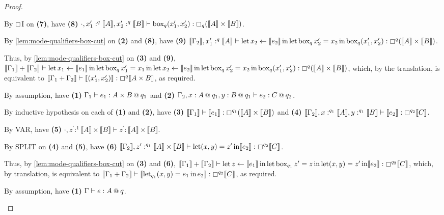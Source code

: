 \documentclass[acmsmall,screen,nonacm]{acmart}
\makeatletter
\DeclareMathOperator{\llet}{\text{let}}
\DeclareMathOperator{\lin}{\text{in}}
\DeclareMathOperator{\bbox}{\text{box}}
\newcommand{\at}{\mathbin{\mbox{\small\ensuremath{@}}}}
\newcommand{\tee}{\vdash}
\newcommand{\sem}[1]{\llbracket #1 \rrbracket}
\makeatother
\begin{document}
\begin{proof}
\begin{description}
    By $\boxempty$I on \textbf{(7)}, have \textbf{(8)} $\cdot, x_1^\prime :^q \sem{A}, x_2^\prime :^q \sem{B} \tee \bbox_q (x_1^\prime, x_2^\prime) : \boxempty_q (\sem{A} \times \sem{B})$.

    By \ref{lem:mode-qualifiers-box-cut} on \textbf{(2)} and \textbf{(8)}, have \textbf{(9)} $\sem{\Gamma_2}, x_1^\prime :^q \sem{A} \tee \llet x_2 \leftarrow \sem{e_2} \lin \llet \bbox_q x_2^\prime = x_2 \lin \bbox_q (x_1^\prime, x_2^\prime) : \boxempty^q (\sem{A} \times \sem{B})$.
    
    Thus, by \ref{lem:mode-qualifiers-box-cut} on \textbf{(3)} and \textbf{(9)}, $\sem{\Gamma_1} + \sem{\Gamma_2} \tee \llet x_1 \leftarrow \sem{e_1} \lin \llet \bbox_q x_1^\prime = x_1 \lin \llet x_2 \leftarrow \sem{e_2} \lin \llet \bbox_q x_2^\prime = x_2 \lin \bbox_q (x_1^\prime, x_2^\prime) : \boxempty^q (\sem{A} \times \sem{B})$, which, by the translation, is equivalent to $\sem{\Gamma_1 + \Gamma_2} \tee \sem{(x_1^\prime, x_2^\prime)} : \boxempty^q \sem{A \times B}$, as required.
    \\
    \item[Case SPLIT.]
    By assumption, have \textbf{(1)} $\Gamma_1 \tee e_1 : A \times B \at q_1$ and \textbf{(2)} $\Gamma_2, x : A \at q_1, y : B \at q_1 \tee e_2 : C \at q_2$.
    
    By inductive hypothesis on each of \textbf{(1)} and \textbf{(2)}, have \textbf{(3)} $\sem{\Gamma_1} \tee \sem{e_1} : \boxempty^{q_1} (\sem{A} \times \sem{B})$ and \textbf{(4)} $\sem{\Gamma_2}, x :^{q_1} \sem{A}, y :^{q_1} \sem{B} \tee \sem{e_2} : \boxempty^{q_2} \sem{C}$.

    By VAR, have \textbf{(5)} $\cdot, z^\prime :^1 \sem{A} \times \sem{B} \tee z^\prime : \sem{A} \times \sem{B}$.

    By SPLIT on \textbf{(4)} and \textbf{(5)}, have \textbf{(6)} $\sem{\Gamma_2}, z^\prime :^{q_1} \sem{A} \times \sem{B} \tee \llet (x, y) = z^\prime \lin \sem{e_2} : \boxempty^{q_2} \sem{C}$.
    
    Thus, by \ref{lem:mode-qualifiers-box-cut} on \textbf{(3)} and \textbf{(6)}, $\sem{\Gamma_1} + \sem{\Gamma_2} \tee \llet z \leftarrow \sem{e_1} \lin \llet \bbox_{q_1} z^\prime = z \lin \llet (x, y) = z^\prime \lin \sem{e_2} : \boxempty^{q_2} \sem{C}$, which, by translation, is equivalent to $\sem{\Gamma_1 + \Gamma_2} \tee \sem{\llet_{q_1} (x, y) = e_1 \lin e_2} : \boxempty^{q_2} \sem{C}$, as required.
    \\
    \item[Case INL.]
    By assumption, have \textbf{(1)} $\Gamma \tee e : A \at q$.
    

\end{description}
\end{proof}
\end{document}
